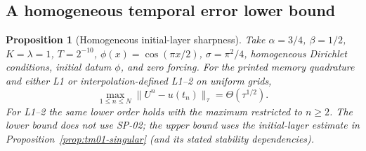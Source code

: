 \documentclass[11pt,a4paper]{amsart}
\theoremstyle{remark}
\theoremstyle{plain}
\newtheorem{proposition}{Proposition}[section]
\theoremstyle{remark}
\numberwithin{equation}{section}
\begin{document}
\subsection{A homogeneous temporal error lower bound}
\begin{proposition}[Homogeneous initial-layer sharpness]\label{prop:aud01-homogeneous}
Take $\alpha=3/4$, $\beta=1/2$, $K=\lambda=1$, $T=2^{-10}$, $\phi(x)=\cos(\pi x/2)$, $\sigma=\pi^2/4$, homogeneous Dirichlet conditions, initial datum $\phi$, and zero forcing. For the printed memory quadrature and either L1 or interpolation-defined L1--2 on uniform grids,
\[
 \max_{1\le n\le N}\|U^n-u(t_n)\|_\tau=\Theta(\tau^{1/2}).
\]
For L1--2 the same lower order holds with the maximum restricted to $n\ge2$. The lower bound does not use SP-02; the upper bound uses the initial-layer estimate in Proposition~\ref{prop:tm01-singular} (and its stated stability dependencies).
\end{proposition}
\end{document}
